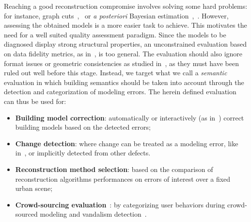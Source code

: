 \documentclass[runningheads]{llncs}
\begin{document}
     Reaching a good reconstruction compromise involves solving some hard problems: for instance, graph cuts~\cite{verdie2015lod},~\cite{zebedin2008fusion} or \textit{a posteriori} Bayesian estimation~\cite{dick2004modelling},~\cite{Lafarge2010}. However, assessing the obtained models is a more easier task to achieve. This motivates the need for a well suited quality assessment paradigm. Since the models to be diagnosed display strong structural properties, an unconstrained evaluation based on data fidelity metrics, as in~\cite{berger2013benchmark}, is too general. The evaluation should also ignore format issues or geometric consistencies as studied in~\cite{ledoux2018val3dity}, as they must have been ruled out well before this stage. Instead, we target what we call a \textit{semantic} evaluation in which building semantics should be taken into account through the detection and categorization of modeling errors. The herein defined evaluation can thus be used for:
    \begin{itemize}
        \item \textbf{Building model correction}: automatically or interactively (as in~\cite{kowdle2011active}) correct building models based on the detected errors;
        \item \textbf{Change detection}: where change can be treated as a modeling error, like in~\cite{taneja2015geometric}, or implicitly detected from other defects.
        \item \textbf{Reconstruction method selection}: based on the comparison of reconstruction algorithms performances on errors of interest over a fixed urban scene;
        \item \textbf{Crowd-sourcing evaluation}~\cite{kovashka2016crowdsourcing}: by categorizing user behaviors during crowd-sourced modeling and vandalism detection~\cite{neis2012towards}.
    \end{itemize}
\end{document}
